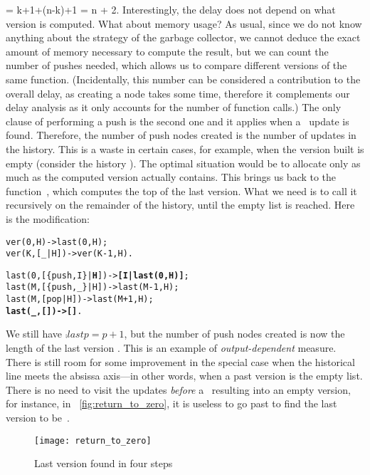  = k+1+(n-k)+1 = n + 2\). Interestingly, the delay
does not depend on what version is computed. What about memory usage?
As usual, since we do not know anything about the strategy of the
garbage collector, we cannot deduce the exact amount of memory
necessary to compute the result, but we can count the number of pushes
needed, which allows us to compare different versions of the same
function. (Incidentally, this number can be considered a contribution
to the overall delay, as creating a node takes some time, therefore it
complements our delay analysis as it only accounts for the number of
function calls.) The only clause of  performing a push
is the second one and it applies when a~ update is
found. Therefore, the number of push nodes created is the number
of  updates in the history. This is a waste in certain
cases, for example, when the version built is empty (consider the
history ). The optimal situation would be to
allocate only as much as the computed version actually contains. This
brings us back to the function~, which computes the top
of the last version. What we need is to call it recursively on the
remainder of the history, until the empty list is reached. Here is the
modification:
\begin{alltt}
ver(0,    H) -> last(0,H);
ver(K,[_|H]) -> ver(K-1,H).

last(0,[\{push,I\}|\textbf{H}]) -> \textbf{[I|last(0,H)]};\hfill% \emph{Keep going back}
last(M,[\{push,_\}|H]) -> last(M-1,H);
last(M,     [pop|H]) -> last(M+1,H);
\textbf{last(_,          []) -> []}.\hfill% \emph{Origin of history}
\end{alltt}
We still have \(\comp{last}{p} = p + 1\), but the number of push nodes
created is now the length of the last version
. This is an example of
\emph{output\hyp{}dependent} measure. There is still room for some
improvement in the special case when the historical line meets the
absissa axis---in other words, when a past version is the empty
list. There is no need to visit the updates \emph{before}
a~ resulting into an empty version, for instance, in
\fig~\vref{fig:return_to_zero}, it is useless to go past
 to find the last version to be~\erlcode{[c]}.
\begin{figure}[!b]
\centering
\texttt{[image: return\_to\_zero]}
\caption{Last version \erlcode{[c]} found in four steps
\label{fig:return_to_zero}}
\end{figure}
